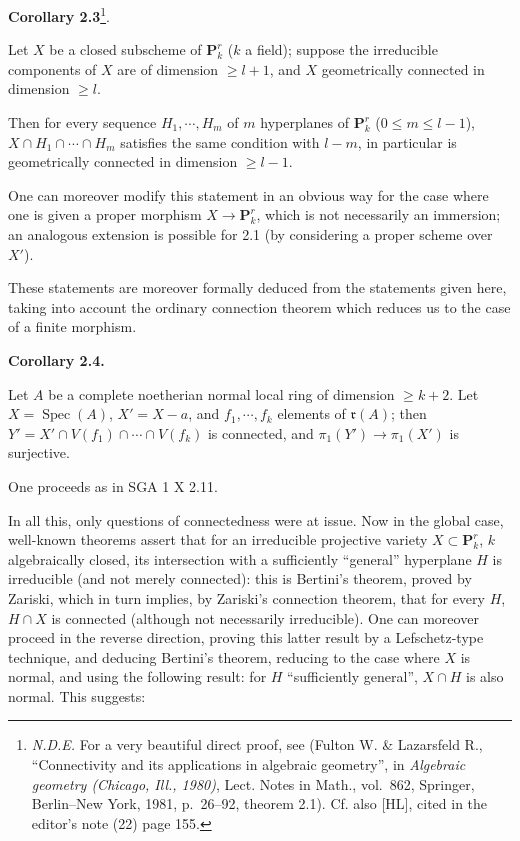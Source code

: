 \documentclass[
]{article}
\begin{document}
\textbf{Corollary 2.3}\footnote{\emph{N.D.E.} For a very beautiful
  direct proof, see (Fulton W. \& Lazarsfeld R., ``Connectivity and its
  applications in algebraic geometry'', in \emph{Algebraic geometry
  (Chicago, Ill., 1980)}, Lect. Notes in Math., vol.~862, Springer,
  Berlin--New York, 1981, p.~26--92, theorem 2.1). Cf. also {[}HL{]},
  cited in the editor's note (22) page 155.}.

Let \(X\) be a closed subscheme of \(\mathbf{P}^{r}_{k}\) (\(k\) a
field); suppose the irreducible components of \(X\) are of dimension
\(\geqslant l + 1\), and \(X\) geometrically connected in dimension
\(\geqslant l\).

Then for every sequence \(H_{1}, \cdots, H_{m}\) of \(m\) hyperplanes of
\(\mathbf{P}^{r}_{k}\) (\(0 \leqslant m \leqslant l - 1\)),
\(X \cap H_{1} \cap \cdots \cap H_{m}\) satisfies the same condition
with \(l - m\), in particular is geometrically connected in dimension
\(\geqslant l - 1\).

One can moreover modify this statement in an obvious way for the case
where one is given a proper morphism \(X \to \mathbf{P}^{r}_{k}\), which
is not necessarily an immersion; an analogous extension is possible for
2.1 (by considering a proper scheme over \(X'\)).

These statements are moreover formally deduced from the statements given
here, taking into account the ordinary connection theorem which reduces
us to the case of a finite morphism.

\textbf{Corollary 2.4.}

Let \(A\) be a complete noetherian normal local ring of dimension
\(\geqslant k + 2\). Let \(X = \operatorname{Spec}(A)\),
\(X' = X - {a}\), and \(f_{1}, \cdots, f_{k}\) elements of
\(\mathfrak{r}(A)\); then
\(Y' = X' \cap V(f_{1}) \cap \cdots \cap V(f_{k})\) is connected, and
\(\pi_{1}(Y') \to \pi_{1}(X')\) is surjective.

One proceeds as in SGA 1 X 2.11.

In all this, only questions of connectedness were at issue. Now in the
global case, well-known theorems assert that for an irreducible
projective variety \(X \subset \mathbf{P}^{r}_{k}\), \(k\) algebraically
closed, its intersection with a sufficiently ``general'' hyperplane
\(H\) is irreducible (and not merely connected): this is Bertini's
theorem, proved by Zariski, which in turn implies, by Zariski's
connection theorem, that for every \(H\), \(H \cap X\) is connected
(although not necessarily irreducible). One can moreover proceed in the
reverse direction, proving this latter result by a Lefschetz-type
technique, and deducing Bertini's theorem, reducing to the case where
\(X\) is normal, and using the following result: for \(H\)
``sufficiently general'', \(X \cap H\) is also normal. This suggests:
\end{document}
